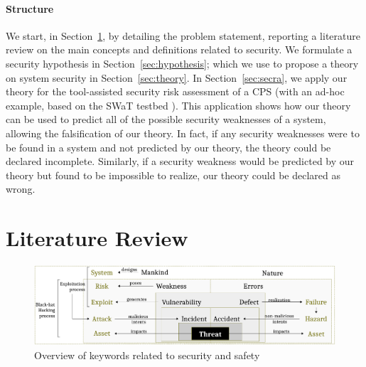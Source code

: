 \documentclass[conference]{IEEEtran}
\begin{document}
\paragraph{Structure} We start, in
Section~\ref{sec:literature}, by detailing the problem statement, reporting a
literature review on the main concepts and definitions related to security.  We
formulate a security hypothesis in Section~\ref{sec:hypothesis}; which we use
to propose a theory on system security in Section~\ref{sec:theory}. In
Section~\ref{sec:secra}, we apply our theory for the tool-assisted security
risk assessment of a CPS (with an ad-hoc example, based on the SWaT testbed
\autocite{Mathur2016swat}).  This application shows how our theory can be used to
predict all of the possible security weaknesses of a system, allowing the
falsification of our theory.  In fact, if any security weaknesses were to be
found in a system and not predicted by our theory, the theory could be declared
incomplete.  Similarly, if a security weakness would be predicted by our theory
but found to be impossible to realize, our theory could be declared as wrong.

\section{Literature Review}\label{sec:literature}
\begin{figure}[t]
	\centering
	\includegraphics[width=.8\textwidth]{safety-security_3.pdf}
	\caption{Overview of keywords related to security and safety}
	\label{fig:safety-security}
\end{figure}
\end{document}
